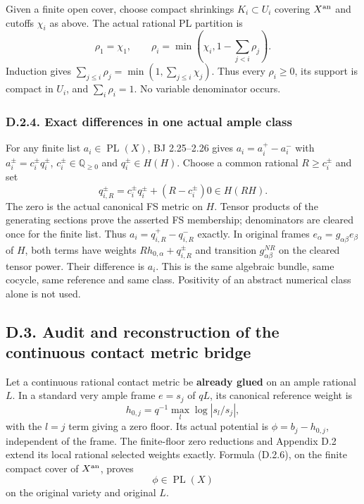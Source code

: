 \documentclass[
  10pt,
]{article}
\begin{document}
Given a finite open cover, choose compact shrinkings \(K_i\subset U_i\)
covering \(X^{\rm an}\) and cutoffs \(\chi_i\) as above. The actual
rational PL partition is
\[\rho_1=\chi_1,\qquad \rho_i=\min(\chi_i,1-\sum_{j<i}\rho_j). \tag{D.2.8}\]
Induction gives \(\sum_{j\le i}\rho_j=\min(1,\sum_{j\le i}\chi_j)\).
Thus every \(\rho_i\ge0\), its support is compact in \(U_i\), and
\(\sum_i\rho_i=1\). No variable denominator occurs.

\subsubsection{D.2.4. Exact differences in one actual ample
class}\label{d.2.4.-exact-differences-in-one-actual-ample-class}

For any finite list \(a_i\in\operatorname{PL}(X)\), BJ 2.25--2.26 gives
\(a_i=a_i^+-a_i^-\) with \(a_i^\pm=c_i^\pm q_i^\pm\),
\(c_i^\pm\in\mathbb Q_{\ge0}\) and \(q_i^\pm\in H(H)\). Choose a common
rational \(R\ge c_i^\pm\) and set
\[q_{i,R}^\pm=c_i^\pm q_i^\pm+(R-c_i^\pm)0\in H(RH). \tag{D.2.9}\] The
zero is the actual canonical FS metric on \(H\). Tensor products of the
generating sections prove the asserted FS membership; denominators are
cleared once for the finite list. Thus \(a_i=q_{i,R}^+-q_{i,R}^-\)
exactly. In original frames \(e_\alpha=g_{\alpha\beta}e_\beta\) of
\(H\), both terms have weights \(Rh_{0,\alpha}+q_{i,R}^\pm\) and
transition \(g_{\alpha\beta}^{NR}\) on the cleared tensor power. Their
difference is \(a_i\). This is the same algebraic bundle, same cocycle,
same reference and same class. Positivity of an abstract numerical class
alone is not used.

\subsection{D.3. Audit and reconstruction of the continuous contact
metric
bridge}\label{d.3.-audit-and-reconstruction-of-the-continuous-contact-metric-bridge}

Let a continuous rational contact metric be \textbf{already glued} on an
ample rational \(L\). In a standard very ample frame \(e=s_j\) of
\(qL\), its canonical reference weight is
\[h_{0,j}=q^{-1}\max_l\log|s_l/s_j|,\] with the \(l=j\) term giving a
zero floor. Its actual potential is \(\phi=b_j-h_{0,j}\), independent of
the frame. The finite-floor zero reductions and Appendix D.2 extend its
local rational selected weights exactly. Formula (D.2.6), on the finite
compact cover of \(X^{\rm an}\), proves \[\phi\in\operatorname{PL}(X)\]
on the original variety and original \(L\).
\end{document}
